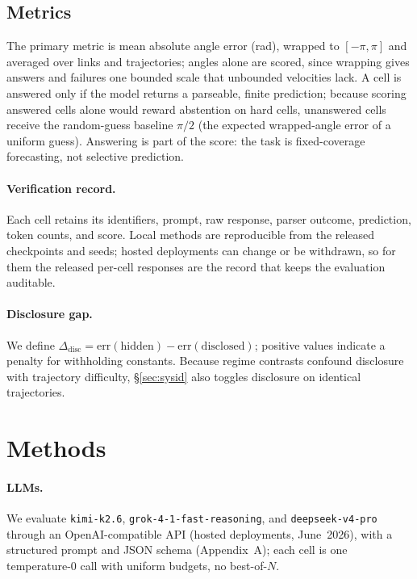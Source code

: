 \documentclass{article}
\begin{document}
\subsection{Metrics}
\label{sec:metrics}
The primary metric is mean absolute angle error (rad), wrapped to $[-\pi,\pi]$ and averaged
over links and trajectories; angles alone are scored, since wrapping gives answers and
failures one bounded scale that unbounded velocities lack. A cell is answered only if the
model returns a parseable, finite prediction; because scoring answered cells alone would
reward abstention on hard cells, unanswered cells receive the random-guess baseline $\pi/2$
(the expected wrapped-angle error of a uniform guess). Answering is part of the score: the
task is fixed-coverage forecasting, not selective prediction.

\paragraph{Verification record.} Each cell retains its identifiers, prompt, raw response,
parser outcome, prediction, token counts, and score. Local methods are reproducible from the
released checkpoints and seeds; hosted deployments can change or be withdrawn, so for them
the released per-cell responses are the record that keeps the evaluation auditable.

\paragraph{Disclosure gap.} We define
$\Delta_{\mathrm{disc}}=\mathrm{err}(\text{hidden})-\mathrm{err}(\text{disclosed})$; positive
values indicate a penalty for withholding constants. Because regime contrasts confound
disclosure with trajectory difficulty, \S\ref{sec:sysid} also toggles disclosure on identical
trajectories.

\section{Methods}
\label{sec:methods}
\paragraph{LLMs.} We evaluate \texttt{kimi-k2.6}, \texttt{grok-4-1-fast-reasoning}, and
\texttt{deepseek-v4-pro} through an OpenAI-compatible API (hosted deployments, June~2026),
with a structured prompt and JSON schema (Appendix~A); each cell is one temperature-$0$ call
with uniform budgets, no best-of-$N$.
\end{document}
